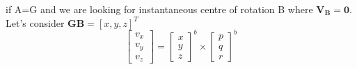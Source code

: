 \documentclass{article}
\begin{document}
if A=G and we are looking for instantaneous centre of rotation B where $\mathbf{V_B} = \mathbf{0}$. 
Let's consider $\mathbf{GB} =[x,y,z]^T$
\begin{equation}
  \begin{bmatrix}
	v_x \\
	v_y \\
	v_z
	\end{bmatrix} =
  \begin{bmatrix}
	x \\
	y \\
	z
	\end{bmatrix}^b \times  \begin{bmatrix}
	p \\
	q \\
	r
	\end{bmatrix}^b
\end{equation}








\end{document}
